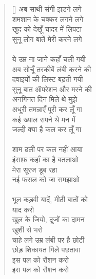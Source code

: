 \begin{verse}[\versewidth]
{अब साथी संगी झड़ने लगे\\
शमशान के चक्कर लगने लगे\\
खुद को देखूँ चादर में लिपटा\\
सुनू लोग बातें मेरी करने लगे\\
\\
ये उम्र ना जाने कहाँ चली गयी\\
अब सोचूँ तरकीबें लंबी करने की\\
दवाइयों की लिस्ट बढ़ती गयी\\
सुनू बात ऑपरेशन और मरने की\\
अनगिनत दिन मिले थे मुझे\\
अधूरी तमन्नाएँ पूरी कर लूँ गा\\
कई ख्याल सपने थे मन में\\
जल्दी क्या है कल कर लूँ गा\\
\\
शाम ढली पर कल नहीं आया\\
इंसाफ़ कहाँ का है बतलाओ\\
मेरा सूरज डूब रहा\\
नई फसल को जा समझाओ\\
\\
भूल कड़वी यादें, मीठी बातों को\\
याद करो\\
खुल के जियो, दूजों का दामन\\
खुशी से भरो\\
चाहे लगे उम्र लंबी पर है छोटी\\
छोड़ शिकायत गिले पछतावा\\
इस पल को रौशन करो\\
इस पल को रौशन करो
}\end{verse}

